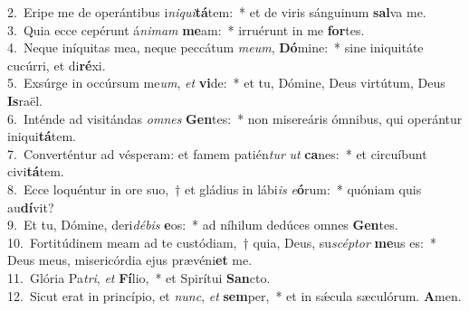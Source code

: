 {2.~}Eripe me de operántibus i\textit{ni}\textit{qui}\textbf{tá}tem:~* et de viris sánguinum \textbf{sal}va me.\\
{3.~}Quia ecce cepérunt á\textit{ni}\textit{mam} \textbf{me}am:~* irruérunt in me \textbf{for}tes.\\
{4.~}Neque iníquitas mea, neque peccátum \textit{me}\textit{um}, \textbf{Dó}mine:~* sine iniquitáte cucúrri, et di\textbf{ré}xi.\\
{5.~}Exsúrge in occúrsum me\textit{um}, \textit{et} \textbf{vi}de:~* et tu, Dómine, Deus virtútum, Deus \textbf{Is}raël.\\
{6.~}Inténde ad visitándas \textit{om}\textit{nes} \textbf{Gen}tes:~* non misereáris ómnibus, qui operántur iniqui\textbf{tá}tem.\\
{7.~}Converténtur ad vésperam: et famem patién\textit{tur} \textit{ut} \textbf{ca}nes:~* et circuíbunt civi\textbf{tá}tem.\\
{8.~}Ecce loquéntur in ore suo,~† et gládius in lábi\textit{is} \textit{e}\textbf{ó}rum:~* quóniam quis au\textbf{dí}vit?\\
{9.~}Et tu, Dómine, deri\textit{dé}\textit{bis} \textbf{e}os:~* ad níhilum dedúces omnes \textbf{Gen}tes.\\
{10.~}Fortitúdinem meam ad te custódiam,~† quia, Deus, su\textit{scép}\textit{tor} \textbf{me}us es:~* Deus meus, misericórdia ejus prævéni\textbf{et} me.\\
{11.~}Glória Pa\textit{tri}, \textit{et} \textbf{Fí}lio,~* et Spirítui \textbf{San}cto.\\
{12.~}Sicut erat in princípio, et \textit{nunc}, \textit{et} \textbf{sem}per,~* et in sǽcula sæculórum. \textbf{A}men.\\
